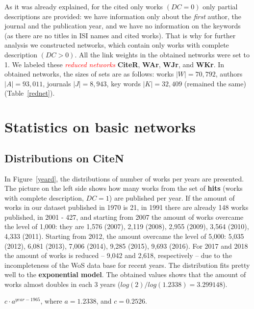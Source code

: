 \documentclass[11pt]{article} %
\newcommand{\keyw}[1]{\textcolor{red}{\emph{#1}}}
\begin{document}
As it was already explained, for the cited only  works  $(DC=0)$ only partial descriptions are provided: we have information only about the \textit{first} author, the journal and the publication year, and we have no information on the keywords (as there are no titles in ISI names and cited works). That is why for further analysis we constructed networks, which contain only works with complete description $(DC>0)$. All the link weights in the obtained networks were set to 1. We labeled these \keyw{reduced networks} \textbf{CiteR}, \textbf{WAr}, \textbf{WJr}, and \textbf{WKr}. In obtained networks, the sizes of sets are as follows: works $|W| = 70,792$, authors $|A| = 93,011$, journals $|J| = 8,943$, key words $|K| = 32,409$ (remained the same) (Table~\ref{rednet}). \medskip 

\section{Statistics on basic networks}

\normalsize
\subsection{Distributions on CiteN}

In Figure~\ref{yeard}, the distributions of number of works per years are presented. The picture on the left side shows how many works from the set of \textbf{hits} (works with complete description, $DC=1$) are published per year. If the amount of works in our dataset published in 1970 is 21, in 1991 there are already 148 works published, in 2001 - 427, and starting from 2007 the amount of works overcame the level of 1,000: they are 1,576 (2007), 2,119 (2008), 2,955 (2009), 3,564 (2010), 4,333 (2011). Starting from 2012, the amount overcame the level of 5,000: 5,035 (2012), 6,081 (2013), 7,006 (2014), 9,285 (2015), 9,693 (2016). For 2017 and 2018 the amount of works is reduced -- 9,042 and 2,618, respectively -- due to the incompleteness of the WoS data base for recent years. The distribution fits pretty well to the \textbf{exponential model}. The obtained values shows that the amount of works almost doubles in each 3 years ($log(2)/log(1.2338) = 3.299148$). \smallskip 

$c\cdot a^{year - 1965}$, where $a = 1.2338$, and $c = 0.2526$. \medskip
\end{document}
